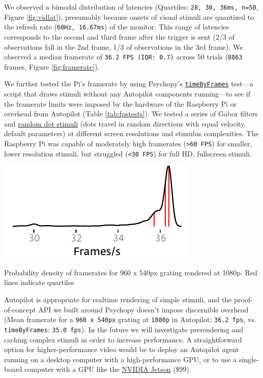 We observed a bimodal distribution of latencies (Quartiles: \texttt{28, 30, 36ms, n=50}, Figure \ref{fig:vidlat}), presumably because onsets of visual stimuli are quantized to the refresh rate (\texttt{60Hz, 16.67ms}) of the monitor. This range of latencies corresponds to the second and third frame after the trigger is sent (2/3 of observations fall in the 2nd frame, 1/3 of observations in the 3rd frame). We observed a median framerate of \texttt{36.2 FPS (IQR: 0.7)} across 50 trials (\texttt{8863} frames, Figure \ref{fig:framerate}). 

We further tested the Pi's framerate by using Psychopy's \href{https://github.com/psychopy/psychopy/blob/3.1/psychopy/demos/coder/timing/timeByFrames.py}{\texttt{timeByFrames}} test---a script that draws stimuli without any Autopilot components running---to see if the framerate limits were imposed by the hardware of the Raspberry Pi or overhead from Autopilot (Table \ref{tab:fpstests}). We tested a series of Gabor filters and \href{https://www.psychopy.org/api/visual/dotstim.html#psychopy.visual.DotStim}{random dot stimuli} (dots travel in random directions with equal velocity, default parameters) at different screen resolutions and stimulus complexities. The Raspberry Pi was capable of moderately high framerates (\texttt{>60 FPS}) for smaller, lower resolution stimuli, but struggled (\texttt{<30 FPS}) for full HD, fullscreen stimuli.

\begin{marginfigure}[-0.7cm]
\includegraphics[]{figures/test_7_fps.pdf}
\caption{Probability density of framerates for 960 x 540px grating rendered at 1080p. Red lines indicate quartiles}
\label{fig:framerate}
\end{marginfigure}

Autopilot is appropriate for realtime rendering of simple stimuli, and the proof-of-concept API we built around Psychopy doesn't impose discernible overhead (Mean framerate for a \texttt{960 x 540px} grating at \texttt{1080p} in Autopilot: \texttt{36.2 fps}, vs. \texttt{timeByFrames}: \texttt{35.0 fps}). In the future we will investigate prerendering and caching complex stimuli in order to increase performance. A straightforward option for higher-performance video would be to deploy an Autopilot agent running on a desktop computer with a high-performance GPU, or to use a single-board computer with a GPU like the \href{https://www.nvidia.com/en-us/autonomous-machines/embedded-systems/jetson-nano/}{NVIDIA Jetson} (\$99).

